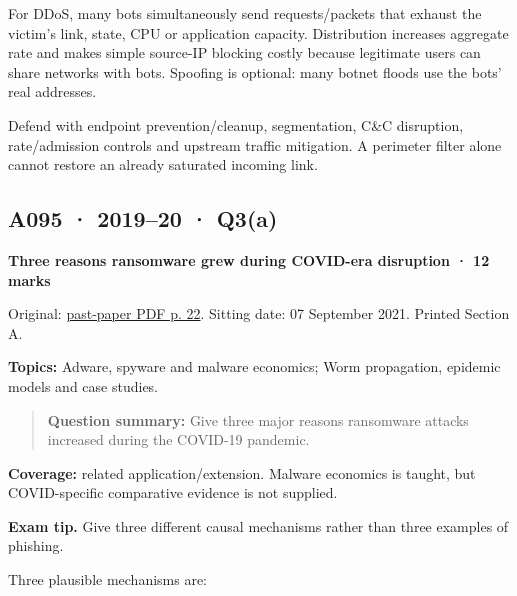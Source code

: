 \documentclass[11pt,a4paper]{article}
\begin{document}
For DDoS,\allowbreak{} many bots simultaneously send requests/\allowbreak{}packets that exhaust the victim's link,\allowbreak{} state,\allowbreak{} CPU or application capacity. Distribution increases aggregate rate and makes simple source-IP blocking costly because legitimate users can share networks with bots. Spoofing is optional: many botnet floods use the bots' real addresses.


Defend with endpoint prevention/\allowbreak{}cleanup,\allowbreak{} segmentation,\allowbreak{} C\&C disruption,\allowbreak{} rate/\allowbreak{}admission controls and upstream traffic mitigation. A perimeter filter alone cannot restore an already saturated incoming link.




\clearpage
\subsection{A095 · 2019–20 · Q3(a)}\label{a095}

\textbf{Three reasons ransomware grew during COVID-era disruption · 12 marks}


Original: \href{../../CSE405-Security_Merged.pdf\#page=22}{past-paper PDF p. 22}. Sitting date: 07 September 2021. Printed Section A.


\textbf{Topics:} Adware,\allowbreak{} spyware and malware economics; Worm propagation,\allowbreak{} epidemic models and case studies.



\begin{quote}\small

\textbf{Question summary:} Give three major reasons ransomware attacks increased during the COVID-19 pandemic.



\end{quote}

\textbf{Coverage:} related application/\allowbreak{}extension. Malware economics is taught,\allowbreak{} but COVID-specific comparative evidence is not supplied.



{\color{ForestGreen}\textbf{Exam tip.} Give three different causal mechanisms rather than three examples of phishing.}


Three plausible mechanisms are:
\end{document}
